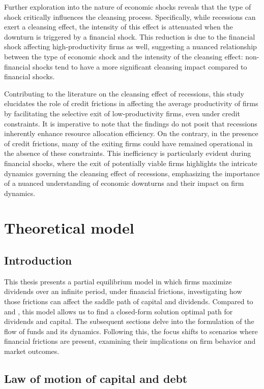 \documentclass[12pt]{report}
\begin{document}
Further exploration into the nature of economic shocks reveals that the type of shock critically influences the
cleansing process. Specifically, while recessions can exert a cleansing effect, the intensity of this effect is
attenuated when the downturn is triggered by a financial shock. This reduction is due to the financial shock affecting
high-productivity firms as well, suggesting a nuanced relationship between the type of economic shock and the intensity
of the cleansing effect: non-financial shocks tend to have a more significant cleansing impact compared to financial
shocks. 

Contributing to the literature on the cleansing effect of recessions, this study elucidates the role of credit frictions
in affecting the average productivity of firms by facilitating the selective exit of low-productivity firms, even under
credit constraints. It is imperative to note that the findings do not posit that recessions inherently enhance resource
allocation efficiency. On the contrary, in the presence of credit frictions, many of the exiting firms could have
remained operational in the absence of these constraints. This inefficiency is particularly evident during financial
shocks, where the exit of potentially viable firms highlights the intricate dynamics governing the cleansing effect of
recessions, emphasizing the importance of a nuanced understanding of economic downturns and their impact on firm
dynamics. 



\chapter{Theoretical model}
\section{Introduction}
This thesis presents a partial equilibrium model in which firms maximize dividends over an infinite period, under financial frictions,
investigating how those frictions can affect the saddle path of capital and dividends. Compared to \cite{OsePap17} and
\cite{CabHarm94}, this
model allows us to find a closed-form solution optimal path for dividends and capital.
The subsequent sections delve into the formulation of the flow of funds and its dynamics. Following this, the focus
shifts to scenarios  where financial frictions are present, examining their
implications on firm behavior and market outcomes. 

\section{Law of motion of capital and debt}
\end{document}
